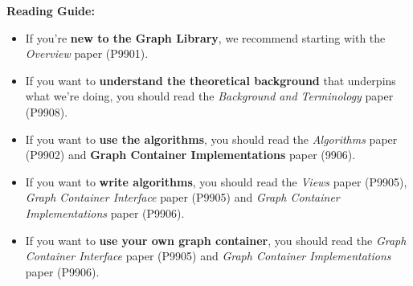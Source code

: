 \textbf{Reading Guide:} 
\begin{itemize}
  \item If you're \textbf{new to the Graph Library}, we recommend starting with the \textit{Overview} paper (P9901).
  \item If you want to \textbf{understand the theoretical background} that underpins what we're doing, you should read the \textit{Background and Terminology} paper (P9908).
  \item If you want to \textbf{use the algorithms}, you should read the \textit{Algorithms} paper (P9902) and \textbf{Graph Container Implementations} paper (9906).
  \item If you want to \textbf{write algorithms}, you should read the \textit{Views} paper (P9905), \textit{Graph Container Interface} paper (P9905) and \textit{Graph Container Implementations} paper (P9906).
  \item If you want to \textbf{use your own graph container}, you should read the \textit{Graph Container Interface} paper (P9905) and \textit{Graph Container Implementations} paper (P9906).
\end{itemize}

  
%
